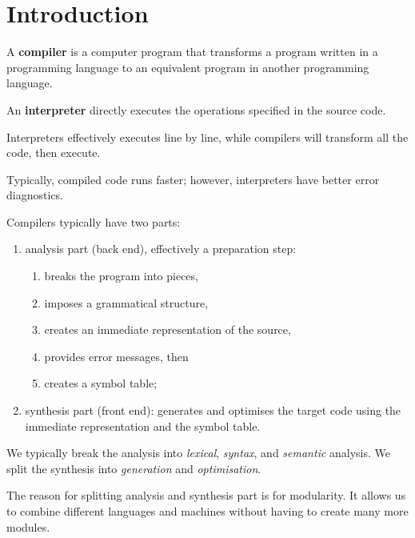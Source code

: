 \chapter{Introduction}

\begin{definition}[Compiler]
    A \textbf{compiler} is a computer program that
    transforms a program written in a programming
    language to an equivalent program in another
    programming language.
\end{definition}

\begin{definition}[Interpreter]
    An \textbf{interpreter} directly executes the
    operations specified in the source code.
\end{definition}

Interpreters effectively executes line by line,
while compilers will transform all the code, then
execute.

Typically, compiled code runs faster; however, 
interpreters have better error diagnostics.

Compilers typically have two parts:
\begin{enumerate}
    \item analysis part (back end), effectively 
        a preparation step:
        \begin{enumerate}
            \item breaks the program into pieces,
            \item imposes a grammatical structure,
            \item creates an immediate representation
                of the source,
            \item provides error messages, then
            \item creates a symbol table;
        \end{enumerate}
    \item synthesis part (front end): generates and
        optimises the target code using the
        immediate representation and the symbol table.
\end{enumerate}

We typically break the analysis into \emph{lexical},
\emph{syntax}, and \emph{semantic} analysis.
We split the synthesis into \emph{generation} and
\emph{optimisation}.

The reason for splitting analysis and synthesis part
is for modularity.
It allows us to combine different languages and machines
without having to create many more modules.

